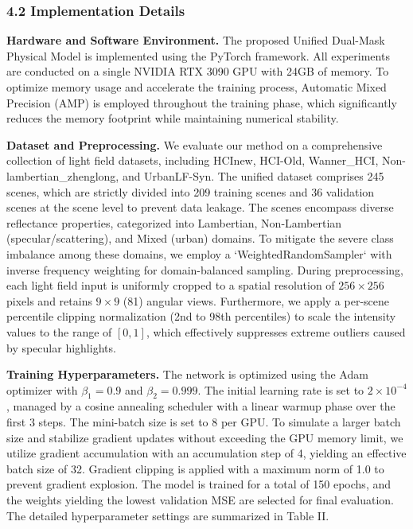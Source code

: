 \subsubsection{4.2 Implementation Details}

\textbf{Hardware and Software Environment.} 
The proposed Unified Dual-Mask Physical Model is implemented using the PyTorch framework. All experiments are conducted on a single NVIDIA RTX 3090 GPU with 24GB of memory. To optimize memory usage and accelerate the training process, Automatic Mixed Precision (AMP) is employed throughout the training phase, which significantly reduces the memory footprint while maintaining numerical stability.

\textbf{Dataset and Preprocessing.} 
We evaluate our method on a comprehensive collection of light field datasets, including HCInew, HCI-Old, Wanner\_HCI, Non-lambertian\_zhenglong, and UrbanLF-Syn. The unified dataset comprises 245 scenes, which are strictly divided into 209 training scenes and 36 validation scenes at the scene level to prevent data leakage. The scenes encompass diverse reflectance properties, categorized into Lambertian, Non-Lambertian (specular/scattering), and Mixed (urban) domains. To mitigate the severe class imbalance among these domains, we employ a `WeightedRandomSampler` with inverse frequency weighting for domain-balanced sampling. During preprocessing, each light field input is uniformly cropped to a spatial resolution of \(256 \times 256\) pixels and retains \(9 \times 9\) (81) angular views. Furthermore, we apply a per-scene percentile clipping normalization (2nd to 98th percentiles) to scale the intensity values to the range of \([0, 1]\), which effectively suppresses extreme outliers caused by specular highlights.

\textbf{Training Hyperparameters.} 
The network is optimized using the Adam optimizer with \(\beta_1 = 0.9\) and \(\beta_2 = 0.999\). The initial learning rate is set to \(2 \times 10^{-4}\), managed by a cosine annealing scheduler with a linear warmup phase over the first 3 steps. The mini-batch size is set to 8 per GPU. To simulate a larger batch size and stabilize gradient updates without exceeding the GPU memory limit, we utilize gradient accumulation with an accumulation step of 4, yielding an effective batch size of 32. Gradient clipping is applied with a maximum norm of 1.0 to prevent gradient explosion. The model is trained for a total of 150 epochs, and the weights yielding the lowest validation MSE are selected for final evaluation. The detailed hyperparameter settings are summarized in Table II.

